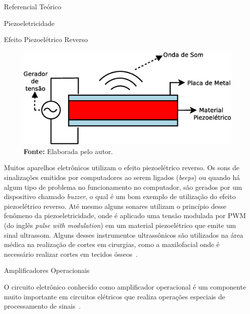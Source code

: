 \begin{chapter}{Referencial Teórico}
\begin{section}{Piezoeletricidade}
\begin{subsection}{Efeito Piezoelétrico Reverso}
\begin{figure}[!h]
	\centering
	\begin{minipage}[c]{\textwidth}
	\centering
	\includegraphics[width=0.8\linewidth]{fig/EfeitoPiezoEletricoReverso}
	\caption{Efeito piezoelétrico reverso.}
	\vspace{-1cm}
	\caption*{\textbf{Fonte: }Elaborada pelo autor.}
	\label{fig:reverso}
	\end{minipage}
\end{figure}

\vspace{-1cm}
Muitos aparelhos eletrônicos utilizam o efeito piezoelétrico reverso. Os sons de
sinalizações emitidos por computadores ao serem ligados (\textit{beeps}) ou
quando há algum tipo de problema no funcionamento no computador, são gerados por
um dispositivo chamado \textit{buzzer}, o qual é um bom exemplo de utilização do
efeito piezoelétrico reverso.  Até mesmo alguns sonares utilizam o princípio
desse fenômeno da piezoeletricidade, onde é aplicado uma tensão modulada por PWM
(do inglês \textit{pulse with modulation}) em um material piezoelétrico que
emite um sinal ultrassom. Alguns desses instrumentos ultrassônicos são
utilizados na área médica na realização de cortes em cirurgias, como a
maxilofacial onde é necessário realizar cortes em tecidos
ósseos~\cite{Carvalho17}. 
 
\end{subsection}

\end{section}

\begin{section}{Amplificadores Operacionais} 

O circuito eletrônico conhecido como amplificador operacional é um componente
muito importante em circuitos elétricos que realiza operações especiais de
processamento de sinais~\cite{Richard2000}. 


\end{section}
\end{chapter}
